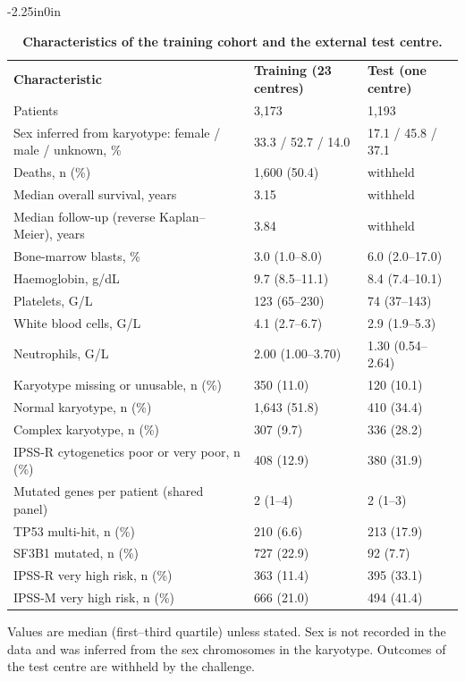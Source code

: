 \documentclass[10pt,letterpaper]{article}
\newlength\savedwidth
\newcommand\thickhline{\noalign{\global\savedwidth\arrayrulewidth\global\arrayrulewidth 2pt}%
\hline
\noalign{\global\arrayrulewidth\savedwidth}}
\begin{document}
\begin{table}[H]
\begin{adjustwidth}{-2.25in}{0in}
\centering
\caption{{\bf Characteristics of the training cohort and the external test centre.}}
\begin{tabular}{|l|l|l|}
\hline
{\bf Characteristic} & {\bf Training (23 centres)} & {\bf Test (one centre)}\\ \thickhline
Patients & 3,173 & 1,193 \\ \hline
Sex inferred from karyotype: female / male / unknown, \% & 33.3 / 52.7 / 14.0 & 17.1 / 45.8 / 37.1 \\ \hline
Deaths, n (\%) & 1,600 (50.4) & withheld \\ \hline
Median overall survival, years & 3.15 & withheld \\ \hline
Median follow-up (reverse Kaplan--Meier), years & 3.84 & withheld \\ \hline
Bone-marrow blasts, \% & 3.0 (1.0--8.0) & 6.0 (2.0--17.0) \\ \hline
Haemoglobin, g/dL & 9.7 (8.5--11.1) & 8.4 (7.4--10.1) \\ \hline
Platelets, G/L & 123 (65--230) & 74 (37--143) \\ \hline
White blood cells, G/L & 4.1 (2.7--6.7) & 2.9 (1.9--5.3) \\ \hline
Neutrophils, G/L & 2.00 (1.00--3.70) & 1.30 (0.54--2.64) \\ \hline
Karyotype missing or unusable, n (\%) & 350 (11.0) & 120 (10.1) \\ \hline
Normal karyotype, n (\%) & 1,643 (51.8) & 410 (34.4) \\ \hline
Complex karyotype, n (\%) & 307 (9.7) & 336 (28.2) \\ \hline
IPSS-R cytogenetics poor or very poor, n (\%) & 408 (12.9) & 380 (31.9) \\ \hline
Mutated genes per patient (shared panel) & 2 (1--4) & 2 (1--3) \\ \hline
TP53 multi-hit, n (\%) & 210 (6.6) & 213 (17.9) \\ \hline
SF3B1 mutated, n (\%) & 727 (22.9) & 92 (7.7) \\ \hline
IPSS-R very high risk, n (\%) & 363 (11.4) & 395 (33.1) \\ \hline
IPSS-M very high risk, n (\%) & 666 (21.0) & 494 (41.4) \\ \hline
\end{tabular}
\begin{flushleft} Values are median (first--third quartile) unless stated. Sex is not
recorded in the data and was inferred from the sex chromosomes in the karyotype. Outcomes
of the test centre are withheld by the challenge.
\end{flushleft}
\label{table1}
\end{adjustwidth}
\end{table}
\end{document}

